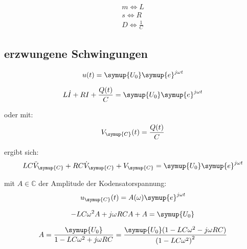         \begin{align}
            m \Leftrightarrow L \\
            s \Leftrightarrow R \\
            D \Leftrightarrow \frac{1}{C}
        \end{align}

    \subsection{erzwungene Schwingungen}

    \begin{equation}
        u(t)= \symup{U_0} \symup{e}^{j \omega t}
    \end{equation}

    \begin{equation}
        L \dot{I} + R I + \frac{Q(t)}{C} = \symup{U_0} \symup{e}^{j \omega t}
    \end{equation}

    oder mit:
    \begin{equation}
        V_{\symup{C}} (t) = \frac{Q(t)}{C}
    \end{equation}

    ergibt sich:
    \begin{equation}
        LC \ddot{V}_{\symup{C}} + RC \dot{V}_{\symup{C}} + V_{\symup{C}} = \symup{U_0} \symup{e}^{j \omega t}
    \end{equation}

    mit $A \in  \mathds{C}$ der Amplitude der Kodensatorspannung:
    \begin{equation}
        u_{\symup{C}} (t) = A(\omega) \symup{e}^{j \omega t}
    \end{equation}

    \begin{equation}
        -LC \omega^2 A + j\omega RC A +A = \symup{U_0}
    \end{equation}

    \begin{equation}
        A= \frac{\symup{U_0}}{1 - LC \omega^2 + j \omega RC} = \frac{ \symup{U_0}(1 -LC \omega^2 - j\omega RC)}{\left( 1- LC \omega^2 \right)^2}
    \end{equation}
    